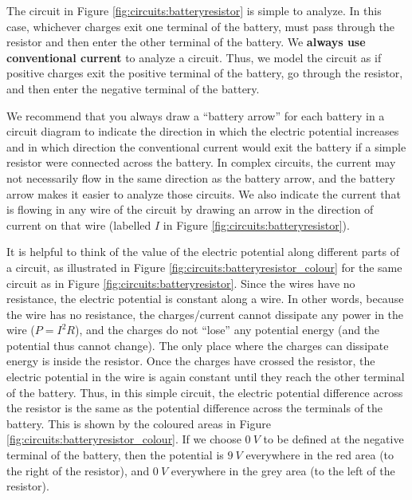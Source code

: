 
The circuit in Figure \ref{fig:circuits:batteryresistor} is simple to analyze. In this case, whichever charges exit one terminal of the battery, must pass through the resistor and then enter the other terminal of the battery. We \textbf{always use conventional current} to analyze a circuit. Thus, we model the circuit as if positive charges exit the positive terminal of the battery, go through the resistor, and then enter the negative terminal of the battery.

We recommend that you always draw a ``battery arrow'' for each battery in a circuit diagram to indicate the direction in which the electric potential increases and in which direction the conventional current would exit the battery if a simple resistor were connected across the battery. In complex circuits, the current may not necessarily flow in the same direction as the battery arrow, and the battery arrow makes it easier to analyze those circuits. We also indicate the current that is flowing in any wire of the circuit by drawing an arrow in the direction of current on that wire (labelled $I$ in Figure \ref{fig:circuits:batteryresistor}).


It is helpful to think of the value of the electric potential along different parts of a circuit, as illustrated in Figure \ref{fig:circuits:batteryresistor_colour} for the same circuit as in Figure \ref{fig:circuits:batteryresistor}.
Since the wires have no resistance, the electric potential is constant along a wire. In other words, because the wire has no resistance, the charges/current cannot dissipate any power in the wire ($P=I^2R$), and the charges do not ``lose'' any potential energy (and the potential thus cannot change). The only place where the charges can dissipate energy is inside the resistor. Once the charges have crossed the resistor, the electric potential in the wire is again constant until they reach the other terminal of the battery. Thus, in this simple circuit, the electric potential difference across the resistor is the same as the potential difference across the terminals of the battery.  This is shown by the coloured areas in Figure \ref{fig:circuits:batteryresistor_colour}. If we choose $\SI{0}{V}$ to be defined at the negative terminal of the battery, then the potential is $\SI{9}{V}$ everywhere in the red area (to the right of the resistor), and $\SI{0}{V}$ everywhere in the grey area (to the left of the resistor). 


